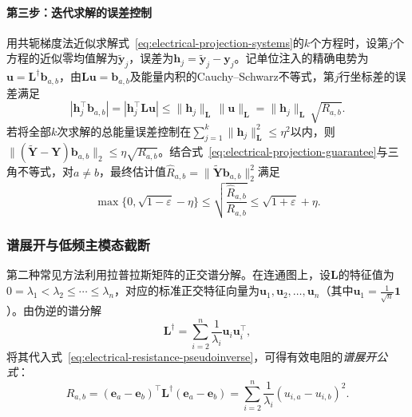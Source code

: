 \paragraph{第三步：迭代求解的误差控制}
用共轭梯度法近似求解式~\eqref{eq:electrical-projection-systems}的$k$个方程时，设第$j$个方程的近似零均值解为$\widetilde{\bm y}_j$，误差为$\bm h_j = \widetilde{\bm y}_j - \bm y_j$。记单位注入的精确电势为$\bm u = \bm L^\dagger \bm b_{a,b}$，由$\bm L\bm u = \bm b_{a,b}$及能量内积的Cauchy--Schwarz不等式，第$j$行坐标差的误差满足
\[
  |\bm h_j^\top \bm b_{a,b}|
  = |\bm h_j^\top \bm L\bm u|
  \leq \lVert\bm h_j\rVert_{\bm L}\,\lVert\bm u\rVert_{\bm L}
  = \lVert\bm h_j\rVert_{\bm L}\,\sqrt{R_{a,b}}.
\]
若将全部$k$次求解的总能量误差控制在$\sum_{j=1}^k \lVert\bm h_j\rVert_{\bm L}^2 \leq \eta^2$以内，则$\lVert(\widetilde{\bm Y}-\bm Y)\bm b_{a,b}\rVert_2\leq\eta\sqrt{R_{a,b}}$。结合式~\eqref{eq:electrical-projection-guarantee}与三角不等式，对$a\ne b$，最终估计值$\widehat R_{a,b} = \lVert \widetilde{\bm Y}\bm b_{a,b}\rVert_2^2$满足
\begin{equation}
  \max\{0, \sqrt{1-\varepsilon} - \eta\}
  \leq \sqrt{\frac{\widehat R_{a,b}}{R_{a,b}}}
  \leq \sqrt{1+\varepsilon} + \eta.
  \label{eq:electrical-resistance-total-error}
\end{equation}

\subsubsection{谱展开与低频主模态截断}
\label{sec:electrical-resistance-spectral-truncation}

第二种常见方法利用拉普拉斯矩阵的正交谱分解。在连通图上，设$\bm L$的特征值为$0=\lambda_1<\lambda_2\leq\cdots\leq\lambda_n$，对应的标准正交特征向量为$\bm u_1,\bm u_2,\ldots,\bm u_n$（其中$\bm u_1=\frac{1}{\sqrt n}\bm 1$）。由伪逆的谱分解
\[
  \bm L^\dagger = \sum_{i=2}^n \frac{1}{\lambda_i}\bm u_i\bm u_i^\top,
\]
将其代入式~\eqref{eq:electrical-resistance-pseudoinverse}，可得有效电阻的\emph{谱展开公式}：
\begin{equation}
  R_{a,b}
  = (\bm e_a - \bm e_b)^\top\bm L^\dagger(\bm e_a - \bm e_b)
  = \sum_{i=2}^n \frac{1}{\lambda_i}(u_{i,a} - u_{i,b})^2.
  \label{eq:electrical-resistance-spectral-sum}
\end{equation}

